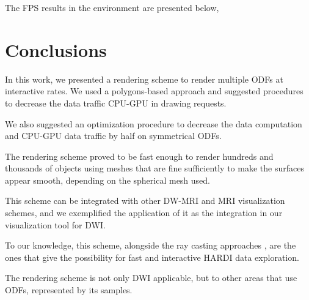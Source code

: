 \documentclass[twoside,twocolumn,10pt]{article}
\begin{document}
The FPS results in the environment are presented below, %












\section{Conclusions}
\label{sec::conclusions}

In this work, we presented a rendering scheme to render multiple ODFs at interactive rates. We used a polygons-based approach and suggested procedures to decrease the data traffic CPU-GPU in drawing requests.

We also suggested an optimization procedure to decrease the data computation and CPU-GPU data traffic by half on symmetrical ODFs.

The rendering scheme proved to be fast enough to render hundreds and thousands of objects using meshes that are fine sufficiently to make the surfaces appear smooth, depending on the spherical mesh used.

This scheme can be integrated with other DW-MRI and MRI visualization schemes, and we exemplified the application of it as the integration in our visualization tool for DWI.

To our knowledge, this scheme, alongside the ray casting approaches \cite{peeters2009,almsick2011}, are the ones that give the possibility for fast and interactive HARDI data exploration.

The rendering scheme is not only DWI applicable, but to other areas that use ODFs, represented by its samples.



\end{document}
